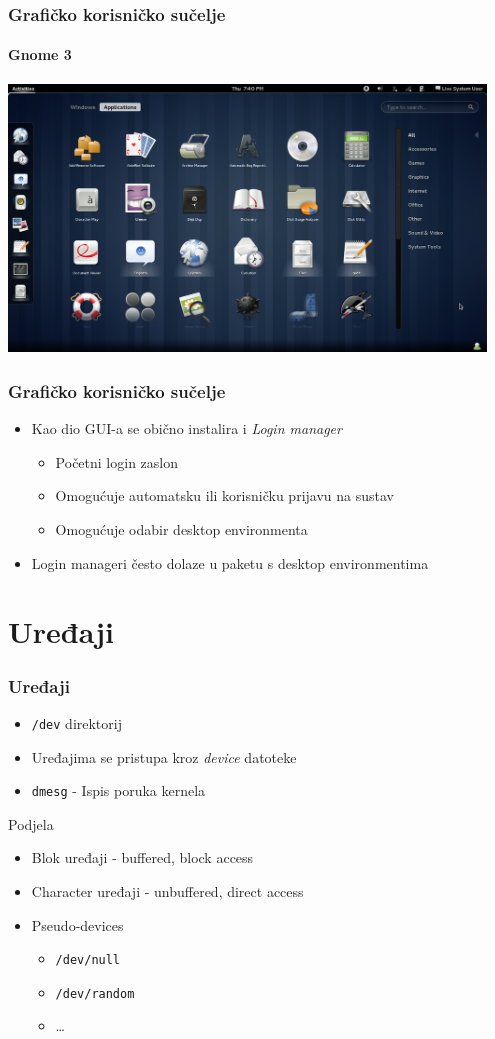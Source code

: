 \documentclass[table,usenames,dvipsnames]{beamer}
\newcommand{\shell}[1]{\texttt{#1}}
\begin{document}
\begin{frame}[t]
	\frametitle{Grafičko korisničko sučelje}
	\framesubtitle{Gnome 3}
	\centering \includegraphics[width=0.95\textwidth]{gnome3.png}
\end{frame}

\begin{frame}[t]
	\frametitle{Grafičko korisničko sučelje}
	\begin{itemize}
		\item Kao dio GUI-a se obično instalira i \emph{Login manager}
		\begin{itemize}
			\item Početni login zaslon
			\item Omogućuje automatsku ili korisničku prijavu na sustav
			\item Omogućuje odabir desktop environmenta
		\end{itemize}
		\item Login manageri često dolaze u paketu s desktop environmentima
	\end{itemize}
\end{frame}

\section{Uređaji}
\begin{frame}[t]
	\frametitle{Uređaji}
	\begin{itemize}
		\item \shell{/dev} direktorij
		\item Uređajima se pristupa kroz \emph{device} datoteke
		\item \shell{dmesg} - Ispis poruka kernela
	\end{itemize}
	Podjela
	\begin{itemize}
		\item Blok uređaji - buffered, block access
		\item Character uređaji - unbuffered, direct access
		\item Pseudo-devices
		\begin{itemize}
			\item \shell{/dev/null}
			\item \shell{/dev/random}
			\item \dots
		\end{itemize}
	\end{itemize}
\end{frame}
\end{document}
